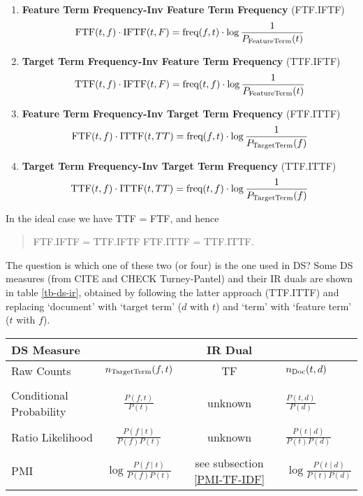 \begin{enumerate}
\item {\bf Feature Term Frequency-Inv Feature Term Frequency} (FTF.IFTF) 
\begin{equation}
\label{ftf-iftf}
\textmd{FTF}(t,f) \cdot \textmd{IFTF}(t, F) =  \textmd{freq}(f, t) \cdot \log{\frac{1}{P_{\textmd{FeatureTerm}}(t)}}
\end{equation}
\item  {\bf Target Term Frequency-Inv Feature Term Frequency} (TTF.IFTF)
\begin{equation}
\label{ttf-iftf}
\textmd{TTF}(t,f) \cdot \textmd{IFTF}(t, F) =  \textmd{freq}(t,f) \cdot \log{\frac{1}{P_{\textmd{FeatureTerm}}(t)}}
\end{equation}
\item {\bf Feature Term Frequency-Inv Target Term Frequency} (FTF.ITTF)
\begin{equation}
\label{ftf-ittf}
\textmd{FTF}(t,f) \cdot \textmd{ITTF}(t, TT) =  \textmd{freq}(f, t) \cdot \log{\frac{1}{P_{\textmd{TargetTerm}}(f)}}
\end{equation}
\item  {\bf Target Term Frequency-Inv Target Term Frequency} (TTF.ITTF)
\begin{equation}
\label{ttf-ittf}
\textmd{TTF}(t,f) \cdot \textmd{ITTF}(t, TT) =  \textmd{freq}(t, f) \cdot \log{\frac{1}{P_{\textmd{TargetTerm}}(f)}}
\end{equation}
\end{enumerate}

In the ideal case we have TTF = FTF, and hence 
\begin{quote}
FTF.IFTF = TTF.IFTF \qquad FTF.ITTF = TTF.ITTF. 
\end{quote}

The question is  which one of these two (or four)  is the one used in DS? Some DS measures (from \cite{BullineriaLevy} CITE and CHECK Turney-Pantel) and their IR duals are shown in table \ref{tb-ds-ir}, obtained by following the latter approach (TTF.ITTF) and  replacing  `document' with `target term'  ($d$ with $t$) and  `term' with `feature term'  ($t$ with $f$).
  
 
\begin{figure*}[htb]
  \centering
  \begin{tabular}{|l|c|c|l|}
  \hline
  DS Measure  && IR Dual &\\
  \hline
 Raw Counts  &$n_{\textmd{TargetTerm}}(f,t)$ & TF &$n_{\textmd{Doc}}(t,d)$\\
 &&&\\
 Conditional Probability &$ \frac{P(f,t)}{P(t)}$ & unknown &$\frac{P(t,d)}{P(d)}$\\
 &&&\\
 Ratio Likelihood & $\frac{P(f \mid t)}{P(f)P(t)}$ & unknown & $\frac{P(t \mid d)}{P(t)P(d)}$\\
 &&&\\
 PMI & $\log{\frac{P(f \mid t)}{P(f)P(t)}}$  & see  subsection \ref{PMI-TF-IDF}&$\log{\frac{P(t \mid d)}{P(t)P(d)}}$\\
 \hline
  \end{tabular}
  \caption{Average score (Pearson) correlation per query.}
  \label{tb-ds-ir}
\end{figure*}

